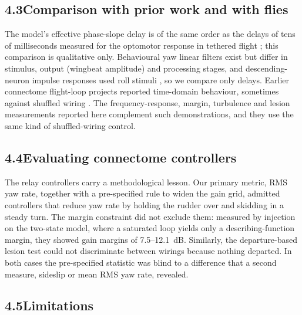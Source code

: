 \documentclass[11pt,letterpaper]{article}
\begin{document}
\subsection{\texorpdfstring{4.3\quad Comparison with prior work and with
flies}{4.3Comparison with prior work and with flies}}\label{comparison-with-prior-work-and-with-flies}

\noindent The model's effective phase-slope delay is of the same order
as the delays of tens of milliseconds measured for the optomotor
response in tethered flight \cite{theobald2010}; this comparison is
qualitative only. Behavioural yaw linear filters exist
\cite{theobald2010} but differ in stimulus, output (wingbeat amplitude)
and processing stages, and descending-neuron impulse responses used roll
stimuli \cite{leibbrandt2021}, so we compare only delays. Earlier
connectome flight-loop projects reported time-domain behaviour,
sometimes against shuffled wiring
\cite{clutch2026,leohio2026,flygm2026}. The frequency-response, margin,
turbulence and lesion measurements reported here complement such
demonstrations, and they use the same kind of shuffled-wiring control.

\subsection{\texorpdfstring{4.4\quad Evaluating connectome
controllers}{4.4Evaluating connectome controllers}}\label{evaluating-connectome-controllers}

\noindent The relay controllers carry a methodological lesson. Our
primary metric, RMS yaw rate, together with a pre-specified rule to
widen the gain grid, admitted controllers that reduce yaw rate by
holding the rudder over and skidding in a steady turn. The margin
constraint did not exclude them: measured by injection on the two-state
model, where a saturated loop yields only a describing-function margin,
they showed gain margins of 7.5--12.1~dB. Similarly, the departure-based
lesion test could not discriminate between wirings because nothing
departed. In both cases the pre-specified statistic was blind to a
difference that a second measure, sideslip or mean RMS yaw rate,
revealed.

\subsection{\texorpdfstring{4.5\quad Limitations}{4.5Limitations}}\label{limitations}
\end{document}

